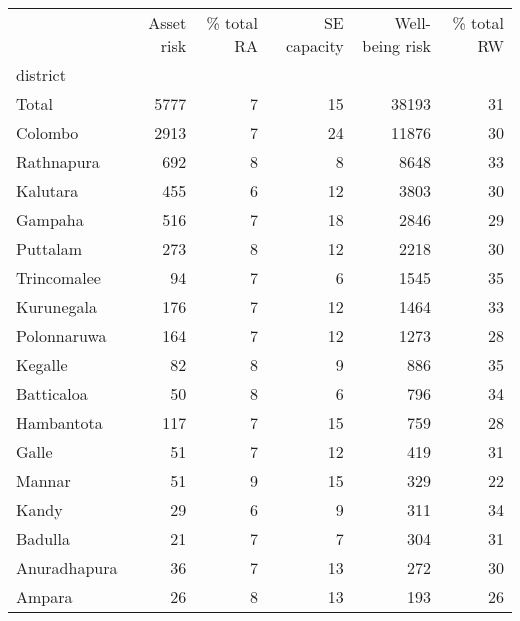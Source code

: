 \begin{tabular}{lrrrrr}
\toprule
{} &  Asset risk &  \% total RA &  SE capacity &  Well-being risk &  \% total RW \\
district     &             &             &              &                  &             \\
\midrule
Total        &        5777 &           7 &           15 &            38193 &          31 \\
Colombo      &        2913 &           7 &           24 &            11876 &          30 \\
Rathnapura   &         692 &           8 &            8 &             8648 &          33 \\
Kalutara     &         455 &           6 &           12 &             3803 &          30 \\
Gampaha      &         516 &           7 &           18 &             2846 &          29 \\
Puttalam     &         273 &           8 &           12 &             2218 &          30 \\
Trincomalee  &          94 &           7 &            6 &             1545 &          35 \\
Kurunegala   &         176 &           7 &           12 &             1464 &          33 \\
Polonnaruwa  &         164 &           7 &           12 &             1273 &          28 \\
Kegalle      &          82 &           8 &            9 &              886 &          35 \\
Batticaloa   &          50 &           8 &            6 &              796 &          34 \\
Hambantota   &         117 &           7 &           15 &              759 &          28 \\
Galle        &          51 &           7 &           12 &              419 &          31 \\
Mannar       &          51 &           9 &           15 &              329 &          22 \\
Kandy        &          29 &           6 &            9 &              311 &          34 \\
Badulla      &          21 &           7 &            7 &              304 &          31 \\
Anuradhapura &          36 &           7 &           13 &              272 &          30 \\
Ampara       &          26 &           8 &           13 &              193 &          26 \\

\end{tabular}
